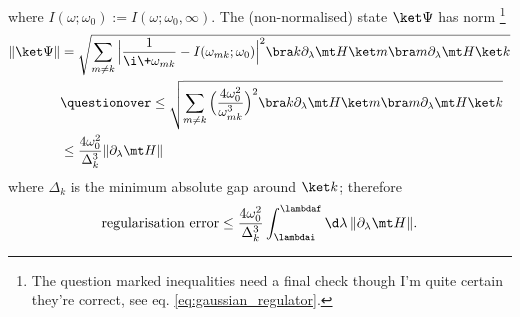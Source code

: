 where $I(\omega; \omega_0) := I(\omega; \omega_0, \infty)$. The (non-normalised) state $\ket\Psi$ has norm \footnote{The question marked inequalities need a final check though I'm quite certain they're correct, see eq. \ref{eq:gaussian_regulator}.}
\begin{align}
    \|\ket\Psi\| &= \sqrt{ \sum_{m\neq k} \Big| \frac1{\i \+ \omega_{mk}} - I(\omega_{mk}; \omega_0) \Big|^2 \bra k\partial_\lambda\mt H\ket m\bra m\partial_\lambda\mt H\ket k } \nonumber \\
    &\questionover\leq \sqrt{ \sum_{m\neq k} \Big( \frac{4\omega_0^2}{\omega_{mk}^3} \Big)^2 \bra k\partial_\lambda\mt H\ket m\bra m\partial_\lambda\mt H\ket k } \nonumber \\
    &\leq \frac{4\omega_0^2}{\Delta_k^3} \|\partial_\lambda\mt H\|
\end{align}
where $\Delta_k$ is the minimum absolute gap around $\ket k$; therefore
\begin{align}
    \text{regularisation error} \leq \frac{4\omega_0^2}{\Delta_k^3} \int_{\lambdai}^{\lambdaf} \d\lambda \, \|\partial_\lambda\mt H\|.
\end{align}


